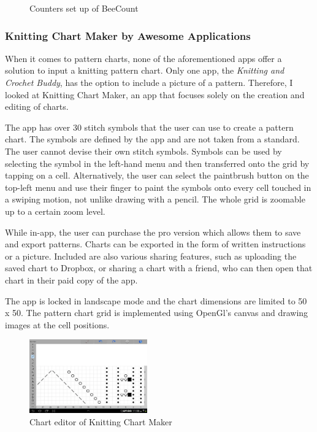 \begin{figure}[H]
\begin{minipage}{.5\textwidth}
  \caption[Counters set up of BeeCount ]{Counters set up of BeeCount}
  \label{fig_beecount2}
\end{minipage}
\end{figure}

\subsubsection*{Knitting Chart Maker by Awesome Applications}
When it comes to pattern charts, none of the aforementioned apps offer a solution to input a knitting pattern chart. Only one app, the \textit{Knitting and Crochet Buddy}, has the option to include a picture of a pattern. Therefore, I looked at Knitting Chart Maker, an app that focuses solely on the creation and editing of charts.

The app has over 30 stitch symbols that the user can use to create a pattern chart. The symbols are defined by the app and are not taken from a standard. The user cannot devise their own stitch symbols. Symbols can be used by selecting the symbol in the left-hand menu and then transferred onto the grid by tapping on a cell. Alternatively, the user can select the paintbrush button on the top-left menu and use their finger to paint the symbols onto every cell touched in a swiping motion, not unlike drawing with a pencil. The whole grid is zoomable up to a certain zoom level.

While in-app, the user can purchase the pro version which allows them to save and export patterns. Charts can be exported in the form of written instructions or a picture. Included are also various sharing features, such as uploading the saved chart to Dropbox, or sharing a chart with a friend, who can then open that chart in their paid copy of the app.

The app is locked in landscape mode and the chart dimensions are limited to 50 x 50. The pattern chart grid is implemented using OpenGl’s canvas and drawing images at the cell positions.

\begin{figure}[H]
  \begin{center}
\includegraphics[width=2in]{images/image03.png}
\caption[Chart editor of Knitting Chart Maker ]{Chart editor of Knitting Chart Maker}
\label{fig_knittingchartmaker}
\end{center}
\end{figure}

